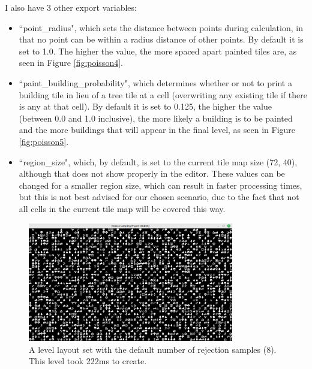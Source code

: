 \newpage

I also have 3 other export variables:

\begin{itemize}
    \item ``point\_radius", which sets the distance between points during calculation, in that no point can be within a radius distance of other points. By default it is set to 1.0. The higher the value, the more spaced apart painted tiles are, as seen in Figure \ref{fig:poisson4}.
    \item ``paint\_building\_probability", which determines whether or not to print a building tile in lieu of a tree tile at a cell (overwriting any existing tile if there is any at that cell). By default it is set to 0.125, the higher the value (between 0.0 and 1.0 inclusive), the more likely a building is to be painted and the more buildings that will appear in the final level, as seen in Figure \ref{fig:poisson5}.
    \item ``region\_size", which, by default, is set to the current tile map size (72, 40), although that does not show properly in the editor. These values can be changed for a smaller region size, which can result in faster processing times, but this is not best advised for our chosen scenario, due to the fact that not all cells in the current tile map will be covered this way.
\end{itemize}

\begin{figure}[H]
    \centering
    \includegraphics[width=0.8\textwidth]{Images/default-poisson-result.png}
    \caption{A level layout set with the default number of rejection samples (8). This level took 222ms to create.}
    \label{fig:poisson1}
\end{figure}

